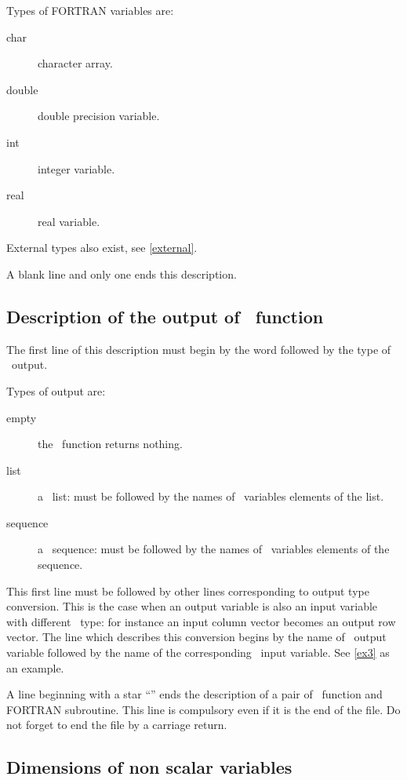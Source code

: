 \smallskip

Types of FORTRAN variables are:
\begin{description}
  \item[char] character array.
  \item[double] double precision variable.
  \item[int] integer variable.
  \item[real] real variable.
\end{description}

External types also exist, see \ref{external}.

\smallskip

A blank line and only one ends this description.

\subsection{Description of the output of \SCI\ function}
\label{output}

The first line of this description must begin by the word  followed
by the type of \SCI\ output.

\smallskip

Types of output are:
\begin{description}
  \item[empty] the \SCI\ function returns nothing.
  \item[list] a \SCI\ list: must be followed by the names of \SCI\ variables
elements of the list.
  \item[sequence] a \SCI\ sequence: must be followed by the names of \SCI\
variables elements of the sequence.
\end{description}

This first line must be followed by other lines corresponding to output type
conversion. This is the case when an output variable is also an input variable
with different \SCI\ type: for instance an input column vector becomes an
output row vector. The line which describes this conversion begins by the name
of \SCI\ output variable followed by the name of the corresponding \SCI\ input
variable. See \ref{ex3} as an example.
\medskip

A line beginning with a star ``\T{*}'' ends the description of a pair of
\SCI\ function and FORTRAN subroutine. This line is compulsory even if it is
the end of the file. Do not forget to end the file by a carriage return.

\subsection{Dimensions of non scalar variables}
\label{dimensions}

